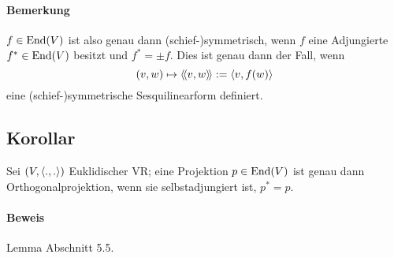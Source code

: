 \paragraph{Bemerkung}
	$ f\in \operatorname{End}(V) $ ist also genau dann (schief-)symmetrisch, wenn $ f $ eine Adjungierte $ f^* \in \operatorname{End}(V)$ besitzt und $ f^* = \pm f $. Dies ist genau dann der Fall, wenn
		\[ (v,w)\mapsto \langle\! \langle v,w \rangle\! \rangle := \langle v,f(w) \rangle \]
	eine (schief-)symmetrische Sesquilinearform definiert.

\subsection{Korollar}
\begin{Korollar}[]
	Sei $ (V,\langle .,. \rangle) $ Euklidischer VR; eine Projektion $ p\in \operatorname{End}(V) $ ist genau dann Orthogonalprojektion, wenn sie selbstadjungiert ist, $ p^* = p $.
\end{Korollar}
\paragraph{Beweis}
	Lemma Abschnitt 5.5.